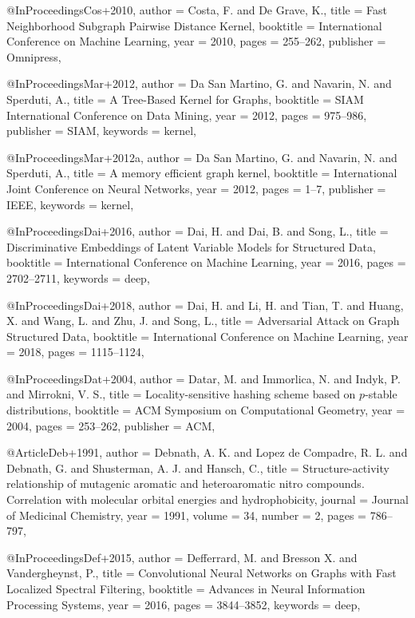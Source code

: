 @InProceedings{Cos+2010,
  author    = {Costa, F. and De Grave, K.},
  title     = {Fast Neighborhood Subgraph Pairwise Distance Kernel},
  booktitle = {International Conference on Machine Learning},
  year      = {2010},
  pages     = {255--262},
  publisher = {Omnipress},
}

@InProceedings{Mar+2012,
  author    = {Da San Martino, G. and Navarin, N. and Sperduti, A.},
  title     = {A Tree-Based Kernel for Graphs},
  booktitle = {SIAM International Conference on Data Mining},
  year      = {2012},
  pages     = {975--986},
  publisher = {SIAM},
  keywords  = {kernel},
}

@InProceedings{Mar+2012a,
  author    = {Da San Martino, G. and Navarin, N. and Sperduti, A.},
  title     = {A memory efficient graph kernel},
  booktitle = {International Joint Conference on Neural Networks},
  year      = {2012},
  pages     = {1--7},
  publisher = {IEEE},
  keywords  = {kernel},
}

@InProceedings{Dai+2016,
  author    = {Dai, H. and Dai, B. and Song, L.},
  title     = {Discriminative Embeddings of Latent Variable Models for Structured Data},
  booktitle = {International Conference on Machine Learning},
  year      = {2016},
  pages     = {2702--2711},
  keywords  = {deep},
}

@InProceedings{Dai+2018,
  author    = {Dai, H. and Li, H. and Tian, T. and Huang, X. and Wang, L. and Zhu, J. and Song, L.},
  title     = {Adversarial Attack on Graph Structured Data},
  booktitle = {International Conference on Machine Learning},
  year      = {2018},
  pages     = {1115--1124},
}

@InProceedings{Dat+2004,
  author    = {Datar, M. and Immorlica, N. and Indyk, P. and Mirrokni, V. S.},
  title     = {Locality-sensitive hashing scheme based on $p$-stable distributions},
  booktitle = {ACM Symposium on Computational Geometry},
  year      = {2004},
  pages     = {253--262},
  publisher = {ACM},
}

@Article{Deb+1991,
  author  = {Debnath, A. K. and Lopez de Compadre, R. L. and Debnath, G. and Shusterman, A. J. and Hansch, C.},
  title   = {Structure-activity relationship of mutagenic aromatic and heteroaromatic nitro compounds. Correlation with molecular orbital energies and hydrophobicity},
  journal = {Journal of Medicinal Chemistry},
  year    = {1991},
  volume  = {34},
  number  = {2},
  pages   = {786--797},
}

@InProceedings{Def+2015,
  author    = {Defferrard, M. and Bresson X. and Vandergheynst, P.},
  title     = {Convolutional Neural Networks on Graphs with Fast Localized Spectral Filtering},
  booktitle = {Advances in Neural Information Processing Systems},
  year      = {2016},
  pages     = {3844--3852},
  keywords  = {deep},
}

